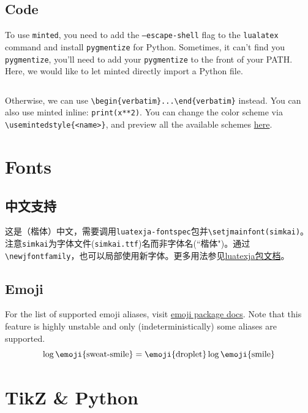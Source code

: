 \documentclass[a4paper]{article}
\begin{document}
\subsection{Code}

To use \texttt{minted}, you need to add the \texttt{--escape-shell} flag to the \texttt{lualatex} command and install \texttt{pygmentize} for Python. Sometimes, it can't find you \texttt{pygmentize}, you'll need to add your \texttt{pygmentize} to the front of your PATH. Here, we would like to let minted directly import a Python file.
\inputminted[linenos]{python}{code/code1.py}
Otherwise, we can use \verb|\begin{verbatim}...\end{verbatim}| instead. You can also use minted inline: \texttt{print(x**2)}. You can change the color scheme via \verb|\usemintedstyle{<name>}|, and preview all the available schemes \href{https://pygments.org/styles/}{here}.

\section{Fonts}

\subsection{中文支持}

这是（楷体）中文，需要调用\verb|luatexja-fontspec|包并\verb|\setjmainfont(simkai)|。注意\verb|simkai|为字体文件(\verb|simkai.ttf|)名而非字体名(``楷体")。{\song 通过\verb|\newjfontfamily|，也可以局部使用新字体。}更多用法参见\href{https://ctan.math.utah.edu/ctan/tex-archive/macros/luatex/generic/luatexja/doc/luatexja-en.pdf}{luatexja包文档}。\\

\subsection{Emoji}
For the list of supported emoji aliases, visit \href{https://ctan.math.utah.edu/ctan/tex-archive/macros/luatex/latex/emoji/emoji-doc.pdf}{emoji package docs}. Note that this feature is highly unstable and only (indeterministically) some aliases are supported.
\begin{equation}
\log \text{\emoji{sweat-smile}} = \text{\emoji{droplet}} \log \text{\emoji{smile}}
\end{equation}

\section{TikZ \& Python}
\end{document}
